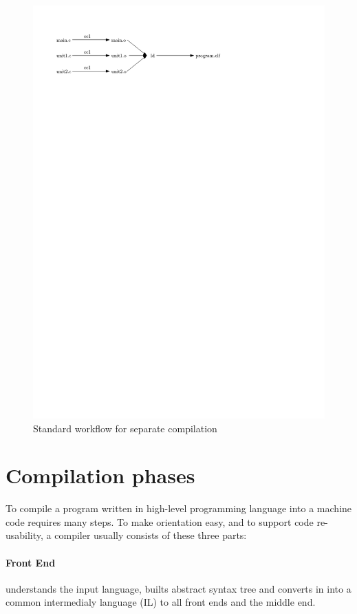 \begin{figure}[h!]
\label{figure-non-lto-workflow}
\centering
\includegraphics{./img/non-lto-workflow.pdf}
\caption{Standard workflow for separate compilation}
\end{figure}


\section{Compilation phases}

To compile a program written in high-level programming language into a machine
code requires many steps. To make orientation easy, and to support code
re-usability, a compiler usually consists of these three parts:

\paragraph{Front End} understands the input language, builts abstract syntax
tree and converts in into a common intermedialy language (IL) to all front ends
and the middle end.

